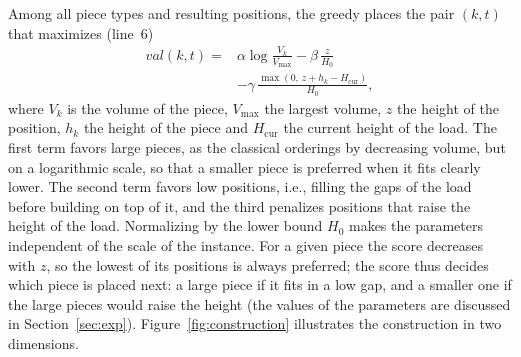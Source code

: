 \documentclass[preprint,12pt,authoryear]{elsarticle}
\begin{document}
Among all piece types and resulting positions, the greedy places the pair $(k,t)$ that maximizes (line~6)
\begin{equation}\label{eq:greedy}
\begin{aligned}
\mathit{val}(k,t)={}&\alpha\log\frac{V_k}{V_{\max}}-\beta\,\frac{z}{H_0}\\
&-\gamma\,\frac{\max(0,\,z+h_k-H_{\text{cur}})}{H_0},
\end{aligned}
\end{equation}
where $V_k$ is the volume of the piece, $V_{\max}$ the largest volume, $z$ the height of the position, $h_k$ the
height of the piece and $H_{\text{cur}}$ the current height of the load. The first term favors large pieces, as the classical orderings by
decreasing volume, but on a logarithmic scale, so that a smaller piece is preferred when it fits clearly lower.
The second term favors low positions, i.e., filling the gaps of the load before building on top of it, and the
third penalizes positions that raise the height of the load. Normalizing by the lower bound $H_0$ makes the
parameters independent of the scale of the instance. For a given piece the score decreases with $z$, so the
lowest of its positions is always preferred; the score thus decides which piece is placed next: a large piece
if it fits in a low gap, and a smaller one if the large pieces would raise the height (the values of the
parameters are discussed in Section~\ref{sec:exp}). Figure~\ref{fig:construction} illustrates the construction
in two dimensions.

\begin{algorithm}[!htb]
\caption{Greedy construction}\label{alg:greedy}
\end{algorithm}
\end{document}
